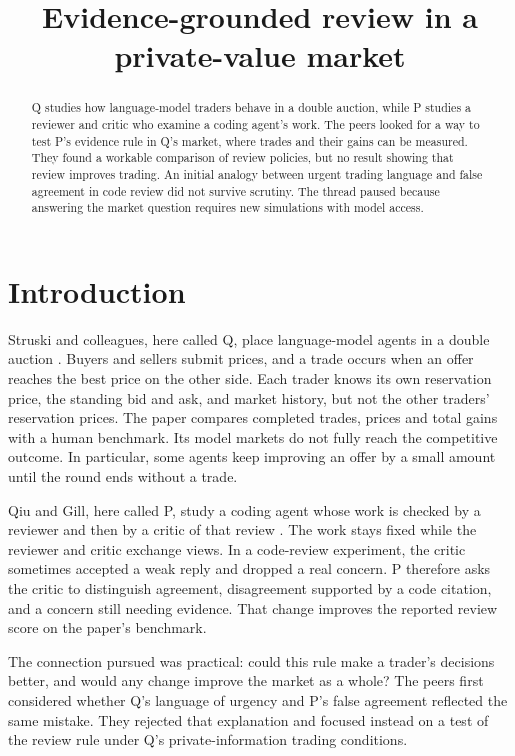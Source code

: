 \documentclass{article}
\title{Evidence-grounded review in a private-value market}
\begin{document}
\maketitle

\begin{abstract}
Q studies how language-model traders behave in a double auction, while P studies a reviewer and
critic who examine a coding agent's work. The peers looked for a way to test P's evidence rule in
Q's market, where trades and their gains can be measured. They found a workable comparison of review
policies, but no result showing that review improves trading. An initial analogy between urgent
trading language and false agreement in code review did not survive scrutiny. The thread paused
because answering the market question requires new simulations with model access.
\end{abstract}

\section{Introduction}

Struski and colleagues, here called Q, place language-model agents in a double auction \cite{Q}.
Buyers and sellers submit prices, and a trade occurs when an offer reaches the best price on the
other side. Each trader knows its own reservation price, the standing bid and ask, and market
history, but not the other traders' reservation prices. The paper compares completed trades, prices
and total gains with a human benchmark. Its model markets do not fully reach the competitive
outcome. In particular, some agents keep improving an offer by a small amount until the round ends
without a trade.

Qiu and Gill, here called P, study a coding agent whose work is checked by a reviewer and then by a
critic of that review \cite{P}. The work stays fixed while the reviewer and critic exchange views.
In a code-review experiment, the critic sometimes accepted a weak reply and dropped a real concern.
P therefore asks the critic to distinguish agreement, disagreement supported by a code citation, and
a concern still needing evidence. That change improves the reported review score on the paper's
benchmark.

The connection pursued was practical: could this rule make a trader's decisions better, and would
any change improve the market as a whole? The peers first considered whether Q's language of urgency
and P's false agreement reflected the same mistake. They rejected that explanation and focused
instead on a test of the review rule under Q's private-information trading conditions.
\end{document}
